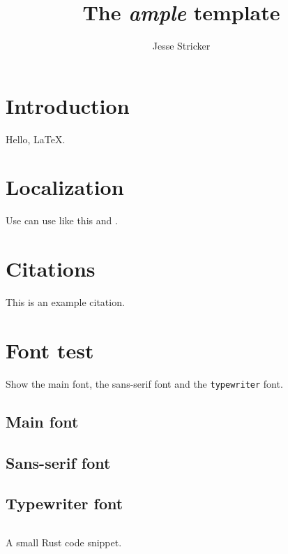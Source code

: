 \documentclass[article,english]{template/ample}
\title{The \emph{ample} template}
\author{Jesse Stricker}
\begin{document}
\maketitle
\tableofcontents


\section{Introduction}

Hello, \LaTeX.

\section{Localization}

Use can use  like this and .

\section{Citations}

This is an example citation\cite{gunn2019}.

\section{Font test}

Show the main font, the \textsf{sans-serif} font and the \texttt{typewriter}
font.

\subsection{Main font}

\blindtext{}

\subsection{Sans-serif font}

{\sffamily\blindtext{}}

\subsection{Typewriter font}

\begin{listing}[H]
  \inputminted{rust}{code-snippet.rs}
  \caption{A small Rust code snippet.\label{lst:small-rust}}
\end{listing}
\end{document}
